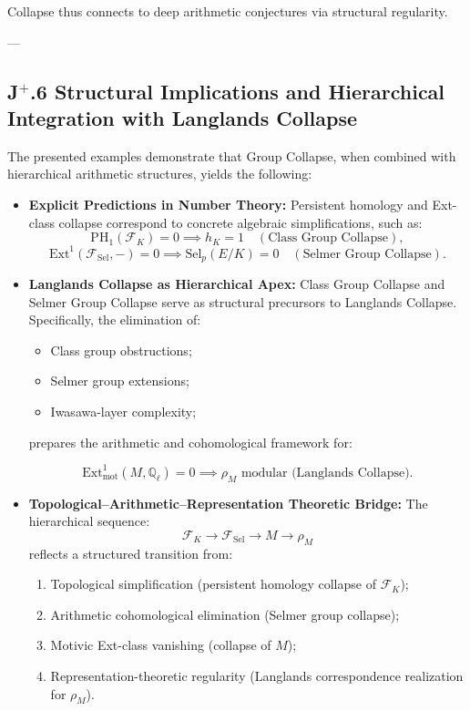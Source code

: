 \documentclass[11pt]{article}
\begin{document}
Collapse thus connects to deep arithmetic conjectures via structural regularity.

---

\subsection*{J$^{+}$.6 Structural Implications and Hierarchical Integration with Langlands Collapse}

The presented examples demonstrate that Group Collapse, when combined with hierarchical arithmetic structures, yields the following:

\begin{itemize}
    \item \textbf{Explicit Predictions in Number Theory:}  
    Persistent homology and Ext-class collapse correspond to concrete algebraic simplifications, such as:
    \[
    \mathrm{PH}_1(\mathcal{F}_K) = 0 \implies h_K = 1 \quad (\text{Class Group Collapse}),
    \]
    \[
    \mathrm{Ext}^1(\mathcal{F}_{\mathrm{Sel}}, -) = 0 \implies \mathrm{Sel}_p(E/K) = 0 \quad (\text{Selmer Group Collapse}).
    \]

    \item \textbf{Langlands Collapse as Hierarchical Apex:}  
    Class Group Collapse and Selmer Group Collapse serve as structural precursors to Langlands Collapse. Specifically, the elimination of:
    \begin{itemize}
        \item Class group obstructions;
        \item Selmer group extensions;
        \item Iwasawa-layer complexity;
    \end{itemize}
    prepares the arithmetic and cohomological framework for:

    \[
    \mathrm{Ext}^1_{\mathrm{mot}}(M, \mathbb{Q}_\ell) = 0 \implies \rho_M \text{ modular (Langlands Collapse)}.
    \]

    \item \textbf{Topological--Arithmetic--Representation Theoretic Bridge:}  
    The hierarchical sequence:
    \[
    \mathcal{F}_K \longrightarrow \mathcal{F}_{\mathrm{Sel}} \longrightarrow M \longrightarrow \rho_M
    \]
    reflects a structured transition from:

    \begin{enumerate}
        \item Topological simplification (persistent homology collapse of \( \mathcal{F}_K \));
        \item Arithmetic cohomological elimination (Selmer group collapse);
        \item Motivic Ext-class vanishing (collapse of \( M \));
        \item Representation-theoretic regularity (Langlands correspondence realization for \( \rho_M \)).
    \end{enumerate}


\end{itemize}
\end{document}
